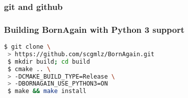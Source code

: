 \documentclass[hyperref={colorlinks, linkcolor=blue, urlcolor=blue}]{beamer}
\begin{document}
\begin{frame}
  \frametitle{git and github}
\end{frame}

\begin{frame}[fragile]
  \frametitle{Building BornAgain with Python 3 support}
    \begin{lstlisting}[language=bash]
 $ git clone \
 > https://github.com/scgmlz/BornAgain.git
 $ mkdir build; cd build
 $ cmake .. \
 > -DCMAKE_BUILD_TYPE=Release \
 > -DBORNAGAIN_USE_PYTHON3=ON
 $ make && make install
    \end{lstlisting}



\end{frame}


\end{document}
